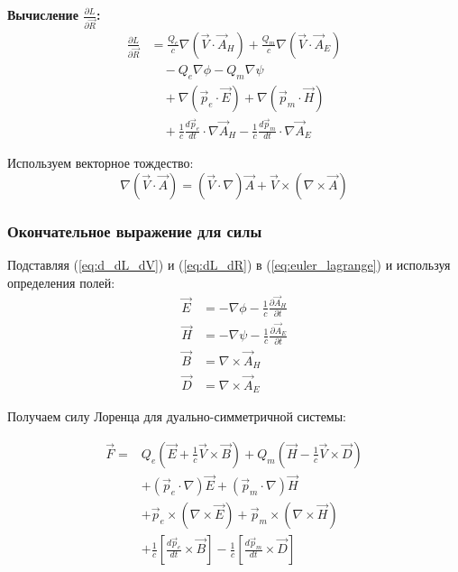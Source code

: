\documentclass[a4paper,12pt]{article}
\begin{document}
\textbf{Вычисление $\frac{\partial L}{\partial \vec{R}}$:}
\begin{align}
\frac{\partial L}{\partial \vec{R}} &= \frac{Q_e}{c}\nabla(\vec{V}\cdot\vec{A}_H) + \frac{Q_m}{c}\nabla(\vec{V}\cdot\vec{A}_E) \nonumber \\
&\quad - Q_e\nabla\phi - Q_m\nabla\psi \nonumber \\
&\quad + \nabla(\vec{p}_e\cdot\vec{E}) + \nabla(\vec{p}_m\cdot\vec{H}) \nonumber \\
&\quad + \frac{1}{c}\frac{d\vec{p}_e}{dt}\cdot\nabla\vec{A}_H - \frac{1}{c}\frac{d\vec{p}_m}{dt}\cdot\nabla\vec{A}_E
\label{eq:dL_dR}
\end{align}

Используем векторное тождество:
\begin{equation}
\nabla(\vec{V}\cdot\vec{A}) = (\vec{V}\cdot\nabla)\vec{A} + \vec{V}\times(\nabla\times\vec{A})
\label{eq:vector_identity}
\end{equation}

\subsubsection{Окончательное выражение для силы}

Подставляя (\ref{eq:d_dL_dV}) и (\ref{eq:dL_dR}) в (\ref{eq:euler_lagrange}) и используя определения полей:
\begin{align}
\vec{E} &= -\nabla\phi - \frac{1}{c}\frac{\partial\vec{A}_H}{\partial t} \\
\vec{H} &= -\nabla\psi - \frac{1}{c}\frac{\partial\vec{A}_E}{\partial t} \\
\vec{B} &= \nabla\times\vec{A}_H \\
\vec{D} &= \nabla\times\vec{A}_E
\end{align}

Получаем силу Лоренца для дуально-симметричной системы:

\begin{equation}
\boxed{
\begin{aligned}
\vec{F} = & Q_e\left(\vec{E} + \frac{1}{c}\vec{V}\times\vec{B}\right) + Q_m\left(\vec{H} - \frac{1}{c}\vec{V}\times\vec{D}\right) \\
& + (\vec{p}_e\cdot\nabla)\vec{E} + (\vec{p}_m\cdot\nabla)\vec{H} \\
& + \vec{p}_e\times(\nabla\times\vec{E}) + \vec{p}_m\times(\nabla\times\vec{H}) \\
& + \frac{1}{c}\left[\frac{d\vec{p}_e}{dt}\times\vec{B}\right] - \frac{1}{c}\left[\frac{d\vec{p}_m}{dt}\times\vec{D}\right]
\end{aligned}
}
\label{eq:final_force}
\end{equation}
\end{document}
